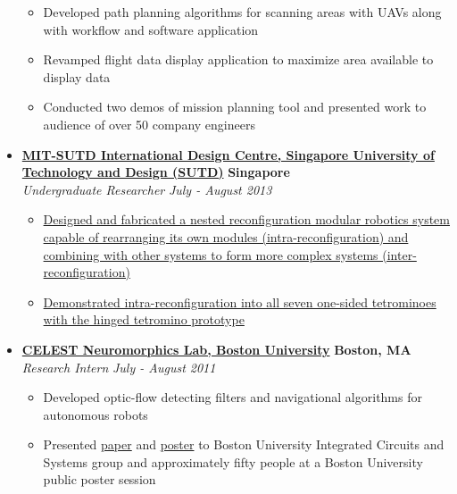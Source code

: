 \documentclass[10pt,letterpaper]{article}
\begin{document}
\begin{itemize}
	\begin{itemize}[label=\textbullet]
	\itemsep0em
	\item Developed path planning algorithms for scanning areas with UAVs along with workflow and software application
	\item Revamped flight data display application to maximize area available to display data
	\item Conducted two demos of mission planning tool and presented work to audience of over 50 company engineers

\end{itemize}

    \item[]
    {\href{http://www.sutd.edu.sg/idc.aspx}{\textbf{MIT-SUTD International Design Centre, Singapore University of Technology and Design (SUTD)}} \hfill
      \textbf{Singapore}}
    \\
    {\emph{Undergraduate Researcher} \hfill \emph{July - August 2013}}
	
	\begin{itemize}[label=\textbullet]
	\itemsep0em
	\item {\href{http://vincentkee.wordpress.com/tetromino/}{Designed and fabricated a nested reconfiguration modular robotics system capable of rearranging its own modules (intra-reconfiguration) and combining with other systems to form more complex systems (inter-reconfiguration)}}
	\item {\href{http://www.youtube.com/watch?v=YFhAlsQ3uYQ}{Demonstrated intra-reconfiguration into all seven one-sided tetrominoes with the hinged tetromino prototype}}

\end{itemize}


    \item[]
    {\href{http://nl.bu.edu/}{\textbf{CELEST Neuromorphics Lab, Boston University}} \hfill
      \textbf{Boston, MA}}
    \\
    {\emph{Research Intern} \hfill \emph{July - August 2011}}
	
	\begin{itemize}[label=\textbullet]
	\itemsep0em
	\item Developed optic-flow detecting filters and navigational algorithms for autonomous robots
	\item Presented \href{http://vincentkee.files.wordpress.com/2011/09/research-paper-the-final-draft.pdf}{paper} and \href{http://vincentkee.files.wordpress.com/2011/09/optic-flow-based-navigation-using-correlation-techniques.png}{poster} to Boston University Integrated Circuits and Systems group and approximately fifty people at a Boston University public poster session
	\end{itemize}
\end{itemize}
\end{document}
